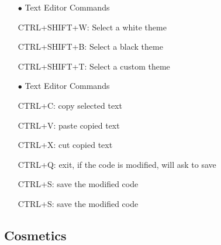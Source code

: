 \documentclass[a4paper,12pt]{article}
\begin{document}
\begin{itemize}
	\setlength{\itemindent}{1em}
	\item[$\bullet$] Text Editor Commands
	\setlength{\itemindent}{3em}
		\item[\ding{118}] CTRL+SHIFT+W: Select a white theme
		\item[\ding{118}] CTRL+SHIFT+B: Select a black theme
		\item[\ding{118}] CTRL+SHIFT+T: Select a custom theme

	\setlength{\itemindent}{1em}
	\item[$\bullet$] Text Editor Commands
	\setlength{\itemindent}{3em}
		\item[\ding{118}] CTRL+C: copy selected text
		\item[\ding{118}] CTRL+V: paste copied text
		\item[\ding{118}] CTRL+X: cut copied text
		\item[\ding{118}] CTRL+Q: exit, if the code is modified, will ask to save
		\item[\ding{118}] CTRL+S: save the modified code
		\item[\ding{118}] CTRL+S: save the modified code
\end{itemize}


\subsection{Cosmetics}\label{cosmetics}
\end{document}
